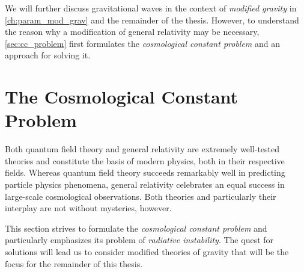 \documentclass[12pt,parskip=half]{scrreprt}
\begin{document}




We will further discuss gravitational waves in the context of \emph{modified gravity} in \autoref{ch:param_mod_grav} and the remainder of the thesis. However, to understand the reason why a modification of general relativity may be necessary, \autoref{sec:cc_problem} first formulates the \emph{cosmological constant problem} and an approach for solving it.

\section{The Cosmological Constant Problem}\label{sec:cc_problem}

Both quantum field theory and general relativity are extremely well-tested theories and constitute the basis of modern physics, both in their respective fields. Whereas quantum field theory succeeds remarkably well in predicting particle physics phenomena, general relativity celebrates an equal success in large-scale cosmological observations. Both theories and particularly their interplay are not without mysteries, however.

This section strives to formulate the \emph{cosmological constant problem} and particularly emphasizes its problem of \emph{radiative instability}. The quest for solutions will lead us to consider modified theories of gravity that will be the focus for the remainder of this thesis.
\end{document}
